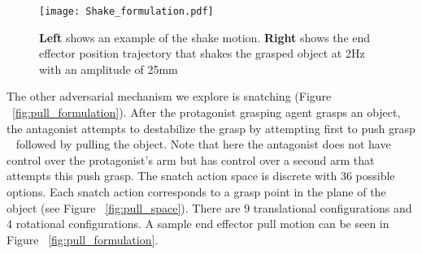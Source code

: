 \documentclass[letterpaper, 10 pt, conference]{ieeeconf}  %
\begin{document}
\begin{figure}[t!]
\begin{center}
\texttt{[image: Shake\_formulation.pdf]}
\end{center}
\caption{\textbf{Left} shows an example of the shake motion. \textbf{Right} shows the end effector position trajectory that shakes the grasped object at 2Hz with an amplitude of 25mm}
\label{fig:shake_formulation}
\end{figure}%
The other adversarial mechanism we explore is snatching (Figure ~\ref{fig:pull_formulation}). After the protagonist grasping agent grasps an object, the antagonist attempts to destabilize the grasp by attempting first to push grasp ~\cite{dogar2011framework} followed by pulling the object. Note that here the antagonist does not have control over the protagonist's arm but has control over a second arm that attempts this push grasp. The snatch action space is discrete with 36 possible options. Each snatch action corresponds to a grasp point in the plane of the object (see Figure ~\ref{fig:pull_space}). There are 9 translational configurations and 4 rotational configurations. A sample end effector pull motion can be seen in Figure ~\ref{fig:pull_formulation}.
\end{document}
